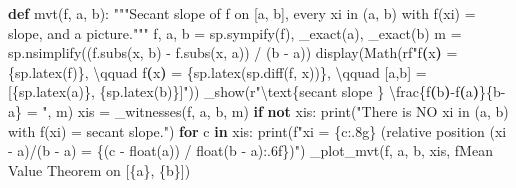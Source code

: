 \documentclass[
  letterpaper,
  DIV=11,
  numbers=noendperiod]{scrreprt}
\newenvironment{Shaded}{\begin{snugshade}}{\end{snugshade}}
\newcommand{\BuiltInTok}[1]{\textcolor[rgb]{0.00,0.23,0.31}{#1}}
\newcommand{\CharTok}[1]{\textcolor[rgb]{0.13,0.47,0.30}{#1}}
\newcommand{\CommentTok}[1]{\textcolor[rgb]{0.37,0.37,0.37}{#1}}
\newcommand{\ControlFlowTok}[1]{\textcolor[rgb]{0.00,0.23,0.31}{\textbf{#1}}}
\newcommand{\ErrorTok}[1]{\textcolor[rgb]{0.68,0.00,0.00}{#1}}
\newcommand{\KeywordTok}[1]{\textcolor[rgb]{0.00,0.23,0.31}{\textbf{#1}}}
\newcommand{\NormalTok}[1]{\textcolor[rgb]{0.00,0.23,0.31}{#1}}
\newcommand{\OperatorTok}[1]{\textcolor[rgb]{0.37,0.37,0.37}{#1}}
\newcommand{\PreprocessorTok}[1]{\textcolor[rgb]{0.68,0.00,0.00}{#1}}
\newcommand{\SpecialCharTok}[1]{\textcolor[rgb]{0.37,0.37,0.37}{#1}}
\newcommand{\SpecialStringTok}[1]{\textcolor[rgb]{0.13,0.47,0.30}{#1}}
\newcommand{\StringTok}[1]{\textcolor[rgb]{0.13,0.47,0.30}{#1}}
\newcommand{\VerbatimStringTok}[1]{\textcolor[rgb]{0.13,0.47,0.30}{#1}}
\theoremstyle{plain}
\theoremstyle{plain}
\theoremstyle{definition}
\theoremstyle{definition}
\theoremstyle{definition}
\theoremstyle{plain}
\theoremstyle{plain}
\theoremstyle{remark}
\begin{document}
\begin{Shaded}
\begin{Highlighting}[]
\KeywordTok{def}\NormalTok{ mvt(f, a, b):}
    \CommentTok{"""Secant slope of f on [a, b], every xi in (a, b) with f\textquotesingle{}(xi) = slope, and a picture."""}
\NormalTok{    f, a, b }\OperatorTok{=}\NormalTok{ sp.sympify(f), \_exact(a), \_exact(b)}
\NormalTok{    m }\OperatorTok{=}\NormalTok{ sp.nsimplify((f.subs(x, b) }\OperatorTok{{-}}\NormalTok{ f.subs(x, a)) }\OperatorTok{/}\NormalTok{ (b }\OperatorTok{{-}}\NormalTok{ a))}
\NormalTok{    display(Math(}\VerbatimStringTok{rf"f}\KeywordTok{(}\VerbatimStringTok{x}\KeywordTok{)}\VerbatimStringTok{ = }\SpecialCharTok{\{}\NormalTok{sp}\SpecialCharTok{.}\NormalTok{latex(f)}\SpecialCharTok{\}}\VerbatimStringTok{, }\ErrorTok{\textbackslash{}}\VerbatimStringTok{qquad f\textquotesingle{}}\KeywordTok{(}\VerbatimStringTok{x}\KeywordTok{)}\VerbatimStringTok{ = }\SpecialCharTok{\{}\NormalTok{sp}\SpecialCharTok{.}\NormalTok{latex(sp.diff(f, x))}\SpecialCharTok{\}}\VerbatimStringTok{, }\ErrorTok{\textbackslash{}}\VerbatimStringTok{qquad }\PreprocessorTok{[a,b]}\VerbatimStringTok{ = }\PreprocessorTok{[}\SpecialCharTok{\{}\NormalTok{sp}\SpecialCharTok{.}\NormalTok{latex(a)}\SpecialCharTok{\}}\PreprocessorTok{, }\SpecialCharTok{\{}\NormalTok{sp}\SpecialCharTok{.}\NormalTok{latex(b)}\SpecialCharTok{\}}\PreprocessorTok{]}\VerbatimStringTok{"}\NormalTok{))}
\NormalTok{    \_show(}\VerbatimStringTok{r"}\CharTok{\textbackslash{}t}\VerbatimStringTok{ext\{secant slope \} }\CharTok{\textbackslash{}f}\VerbatimStringTok{rac\{f}\KeywordTok{(}\VerbatimStringTok{b}\KeywordTok{)}\VerbatimStringTok{{-}f}\KeywordTok{(}\VerbatimStringTok{a}\KeywordTok{)}\VerbatimStringTok{\}\{b{-}a\} = "}\NormalTok{, m)}
\NormalTok{    xis }\OperatorTok{=}\NormalTok{ \_witnesses(f, a, b, m)}
    \ControlFlowTok{if} \KeywordTok{not}\NormalTok{ xis:}
        \BuiltInTok{print}\NormalTok{(}\StringTok{"There is NO xi in (a, b) with f\textquotesingle{}(xi) = secant slope."}\NormalTok{)}
    \ControlFlowTok{for}\NormalTok{ c }\KeywordTok{in}\NormalTok{ xis:}
        \BuiltInTok{print}\NormalTok{(}\SpecialStringTok{f"xi = }\SpecialCharTok{\{}\NormalTok{c}\SpecialCharTok{:.8g\}}\SpecialStringTok{   (relative position (xi {-} a)/(b {-} a) = }\SpecialCharTok{\{}\NormalTok{(c }\OperatorTok{{-}} \BuiltInTok{float}\NormalTok{(a)) }\OperatorTok{/} \BuiltInTok{float}\NormalTok{(b }\OperatorTok{{-}}\NormalTok{ a)}\SpecialCharTok{:.6f\}}\SpecialStringTok{)"}\NormalTok{)}
\NormalTok{    \_plot\_mvt(f, a, b, xis, }\SpecialStringTok{f\textquotesingle{}Mean Value Theorem on [}\SpecialCharTok{\{}\NormalTok{a}\SpecialCharTok{\}}\SpecialStringTok{, }\SpecialCharTok{\{}\NormalTok{b}\SpecialCharTok{\}}\SpecialStringTok{]\textquotesingle{}}\NormalTok{)}



\end{Highlighting}
\end{Shaded}
\end{document}
